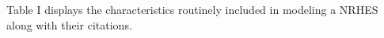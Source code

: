 \documentclass{article}                                                                           %
\begin{document}
\begin{linenumbers}

Table I displays the characteristics routinely included in modeling a NRHES along with their citations.


\end{linenumbers}
\end{document}
